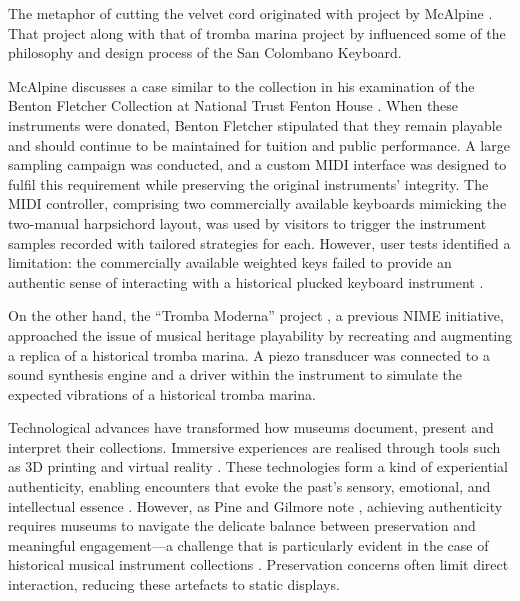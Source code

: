 The metaphor of cutting the velvet cord originated with project by McAlpine \cite{mcalpine_sampling_2014}. That project along with that of tromba marina project by \cite{baldwin_tromba_2016} influenced some of the philosophy and design process of the San Colombano Keyboard.

McAlpine discusses a case similar to the  collection in his examination of the Benton Fletcher Collection at National Trust Fenton House \cite{mcalpine_sampling_2014}. When these instruments were donated, Benton Fletcher stipulated that they remain playable and should continue to be maintained for tuition and public performance. A large sampling campaign was conducted, and a custom MIDI interface was designed to fulfil this requirement while preserving the original instruments' integrity. The MIDI controller, comprising two commercially available keyboards mimicking the two-manual harpsichord layout, was used by visitors to trigger the instrument samples recorded with tailored strategies for each. However, user tests identified a limitation: the commercially available weighted keys failed to provide an authentic sense of interacting with a historical plucked keyboard instrument \cite{mcalpine_sampling_2014}. 

On the other hand, the ``Tromba Moderna'' project \cite{baldwin_tromba_2016}, a previous NIME initiative, approached the issue of musical heritage playability by recreating and augmenting a replica of a historical tromba marina. A piezo transducer was connected to a sound synthesis engine and a driver within the instrument to simulate the expected vibrations of a historical tromba marina. 

Technological advances have transformed how museums document, present and interpret their collections. Immersive experiences are realised through tools such as 3D printing and virtual reality \cite{allard_use-of-hand-held_2005,wachowiak_3d-scanning_2009,music_3d-printed_2024,kuzminsky_three-dimensional_2012,schaich_from_2007}. These technologies form a kind of experiential authenticity, enabling encounters that evoke the past's sensory, emotional, and intellectual essence \cite{trant_when_1999}. However, as Pine and Gilmore note \cite{pine_museums_2007}, achieving authenticity requires museums to navigate the delicate balance between preservation and meaningful engagement—a challenge that is particularly evident in the case of historical musical instrument collections \cite{mcalpine_sampling_2014}. Preservation concerns often limit direct interaction, reducing these artefacts to static displays.

